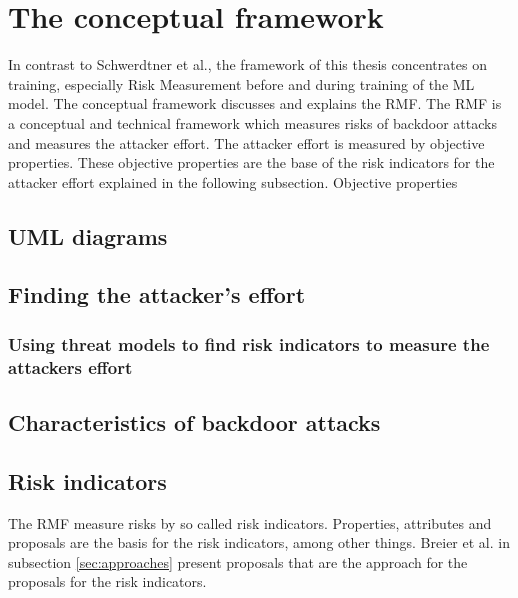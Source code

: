 \section{The conceptual framework}
\label{sec:conFrame}

In contrast to Schwerdtner et al., the framework of this thesis concentrates on training, especially Risk Measurement before and during training of the ML model.
The conceptual framework discusses and explains the RMF. The RMF is a conceptual and technical framework which measures risks of backdoor attacks and measures the attacker effort. The attacker effort
is measured by objective properties. These objective properties are the base of the risk indicators for the attacker effort explained in the following subsection. Objective properties

\subsection{UML diagrams}

\subsection{Finding the attacker's effort}

\subsubsection*{Using threat models to find risk indicators to measure the attackers effort}

\subsection{Characteristics of backdoor attacks}

\subsection{Risk indicators}
\label{sec:risk_indicators}

The RMF measure risks by so called risk indicators. Properties, attributes and proposals are the basis for the risk indicators, among other things. Breier et al. in subsection \ref{sec:approaches} present proposals that are the approach for the proposals for the risk indicators.
